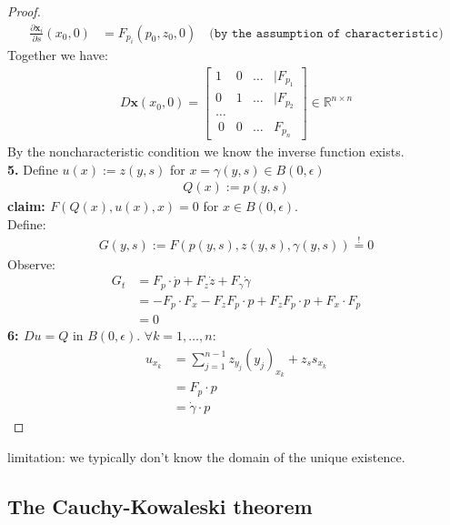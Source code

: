 \begin{proof}
\begin{align*}
	\frac{\partial \textbf{x}_i }{\partial s}(x_0, 0) &= F_{p_i}(p_0, z_0, 0)
	\quad \texttt{(by the assumption of characteristic)}
\end{align*} 
Together we have:
\begin{align*}
D\textbf{x}(x_0, 0)= 
	\begin{bmatrix}
		1 & 0 & \dots &|F_{p_1}\\
		0 & 1 & \dots &|F_{p_2}\\
		\dots\\\
		0 & 0 & \dots & F_{p_n} 
	\end{bmatrix}
	\in \mathbb{R}^{n \times n}
\end{align*}
By the noncharacteristic condition we know the inverse function exists. \\
\textbf{5.} Define $u(x):= z(y, s)$ for $x = \gamma(y, s) \in B(0, \epsilon)$
\begin{align*}
	Q(x):= p(y, s)
\end{align*}
\textbf{claim: $F(Q(x), u(x), x) = 0$} for $x \in B(0, \epsilon)$. \\
Define:
\begin{align*}
	G(y,s):= F(p(y, s), z(y, s), \gamma(y, s)) \overset{!}{=} 0
\end{align*}
Observe:
\begin{align*}
	G_t &= F_p \cdot \dot{p} + F_z \dot{z} + F_\gamma \dot{\gamma}\\
		&= - F_p \cdot  F_x - F_z F_p \cdot p+ F_z F_p \cdot p + F_x \cdot F_p \\
		&= 0
\end{align*}
\textbf{6: $Du = Q$} in $B(0, \epsilon)$. $\forall k = 1, \dots, n$:
\begin{align*}
	u_{x_k} &= \sum_{j = 1}^{n - 1} z_{y_j} (y_j)_{x_k} + z_s s_{x_k}\\
	&= 
	F_p \cdot p\\
	&= 
	\dot{\gamma} \cdot p
\end{align*}

\end{proof}

limitation: we typically don't know the domain of the unique existence.


\subsection{The Cauchy-Kowaleski theorem}

